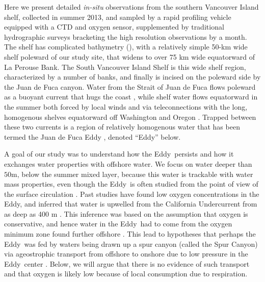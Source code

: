 \documentclass[draft]{agujournal2019}
\newcommand*{\Eddy}{{\sc Eddy}}
\begin{document}
Here we present detailed \emph{in-situ} observations from the southern Vancouver Island shelf, collected in summer 2013, and sampled by a rapid profiling vehicle equipped with a CTD and oxygen sensor, supplemented by traditional hydrographic surveys bracketing the high resolution observations by a month. The shelf has complicated bathymetry (), with a relatively simple 50-km wide shelf poleward of our study site, that widens to over 75 km wide equatorward of La Perouse Bank.  The South Vancouver Island Shelf is this wide shelf region, characterized by a number of banks, and finally is incised on the poleward side by the Juan de Fuca canyon.   Water from the Strait of Juan de Fuca flows poleward as a buoyant current that hugs the coast \cite{thomsonetal89, hickeyetal91}, while shelf water flows equatorward in the summer both forced by local winds and via teleconnections with the long, homogenous shelves equatorward off Washington and Oregon \cite{hickeyetal91,thomsonkrassovski15,engidaetal16}.  Trapped between these two currents is a region of relatively homogenous water that has been termed the Juan de Fuca Eddy \cite{freelanddenman82,freelandmcintosh89,foremanetal07,macfadyenhickey10}, denoted ``\Eddy'' below.

A goal of our study was to understand how the \Eddy\ persists and how it exchanges water properties with offshore water.  We focus on water deeper than $50 \mathrm{m}$, below the summer mixed layer, because this water is trackable with water mass properties, even though the \Eddy\ is often studied from the point of view of the surface circulation \citep[e.g.][]{macfadyenhickey10}.  Past studies have found low oxygen concentrations in the \Eddy, and inferred that water is upwelled from the California Undercurrent from as deep as 400 m \cite{freelanddenman82,deweycrawford88}.  This inference was based on the assumption that oxygen is conservative, and hence water in the \Eddy\ had to come from  the oxygen minimum zone found further offshore \cite{mackasetal87}.  This lead to hypotheses that perhaps the \Eddy\ was fed by waters being drawn up a spur canyon (called the Spur Canyon) via ageostrophic transport from offshore to onshore due to low pressure in the \Eddy\ center \cite{weaverhsieh87}.  Below, we will argue that there is no evidence of such transport and that oxygen is likely low because of local consumption due to respiration.
\end{document}
